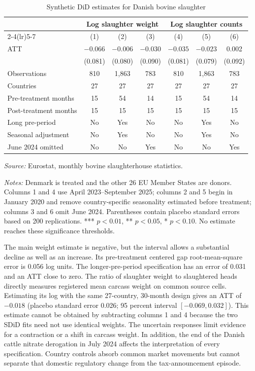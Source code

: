 \documentclass[11pt]{article}
\newcommand{\figurenotes}[2]{\begin{minipage}{0.96\linewidth}\small\textit{Source:} #1\par\textit{Notes:} #2\end{minipage}}
\begin{document}
\begin{table}[htbp]\centering
\caption{Synthetic DiD estimates for Danish bovine slaughter}\label{tab:production}
\small
\setlength{\tabcolsep}{4pt}
\begin{tabular}{lcccccc}\toprule
 & \multicolumn{3}{c}{Log slaughter weight} & \multicolumn{3}{c}{Log slaughter counts} \\
\cmidrule(lr){2-4}\cmidrule(lr){5-7}
 & (1) & (2) & (3) & (4) & (5) & (6) \\\midrule
ATT & $-0.066$ & $-0.006$ & $-0.030$ & $-0.035$ & $-0.023$ & 0.002 \\
 & (0.081) & (0.080) & (0.090) & (0.081) & (0.079) & (0.092) \\\midrule
Observations & 810 & 1,863 & 783 & 810 & 1,863 & 783 \\
Countries & 27 & 27 & 27 & 27 & 27 & 27 \\
Pre-treatment months & 15 & 54 & 14 & 15 & 54 & 14 \\
Post-treatment months & 15 & 15 & 15 & 15 & 15 & 15 \\
Long pre-period & No & Yes & No & No & Yes & No \\
Seasonal adjustment & No & Yes & No & No & Yes & No \\
June 2024 omitted & No & No & Yes & No & No & Yes \\\bottomrule
\end{tabular}
\figurenotes{Eurostat, monthly bovine slaughterhouse statistics.}{Denmark is treated and the other 26 EU Member States are donors. Columns 1 and 4 use April 2023--September 2025; columns 2 and 5 begin in January 2020 and remove country-specific seasonality estimated before treatment; columns 3 and 6 omit June 2024. Parentheses contain placebo standard errors based on 200 replications. *** $p<0.01$, ** $p<0.05$, * $p<0.10$. No estimate reaches these significance thresholds.}
\end{table}

The main weight estimate is negative, but the interval allows a substantial decline as well as an increase. Its pre-treatment centered gap root-mean-square error is 0.056 log units. The longer-pre-period specification has an error of 0.031 and an ATT close to zero. The ratio of slaughter weight to slaughtered heads directly measures registered mean carcass weight on common source cells. Estimating its log with the same 27-country, 30-month design gives an ATT of $-0.018$ (placebo standard error 0.026; 95 percent interval $[-0.069,0.032]$). This estimate cannot be obtained by subtracting columns 1 and 4 because the two SDiD fits need not use identical weights. The uncertain responses limit evidence for a contraction or a shift in carcass weight. In addition, the end of the Danish cattle nitrate derogation in July 2024 affects the interpretation of every specification. Country controls absorb common market movements but cannot separate that domestic regulatory change from the tax-announcement episode.
\end{document}
